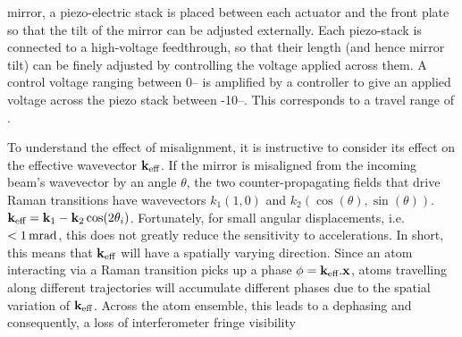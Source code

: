 mirror, a piezo-electric stack is placed between each actuator and the front
plate so that the tilt of the mirror can be adjusted externally. Each
piezo-stack is connected to a high-voltage feedthrough, so that their length
(and hence mirror tilt) can be finely adjusted by controlling the voltage
applied across them. A control voltage ranging between 0-- is
amplified by a controller to give an applied voltage across the piezo stack
between -10--. This corresponds to a travel range of
. \par\noindent To understand the effect of
misalignment, it is instructive to consider its effect on the effective
wavevector \({\textbf k_\textnormal{eff}}\). If the
mirror is misaligned from the incoming beam's wavevector by an angle
\(\theta\),
the two counter-propagating fields that drive Raman transitions have wavevectors
\(k_1 \left(1,0\right)\) and \(k_2 \left(\cos(\theta),\sin(\theta)\right)\).
\({\textbf k_\textnormal{eff}} = {\textbf k_1} - {\textbf k_2} \cos (2\theta_i)\). Fortunately, for
small angular displacements, i.e. \(< \sivalue{1}{\milli\radian}\), this does
not greatly reduce the sensitivity to accelerations. In short, this means that
\({\textbf k_\textnormal{eff}}\) will have a spatially varying direction. Since an atom interacting via
a Raman transition picks up a phase \(\phi = {\textbf k_\textnormal{eff}} . {\textbf x}\), atoms
travelling along different trajectories will accumulate different phases due to
the spatial variation of \({\textbf k_\textnormal{eff}}{}\). Across the atom ensemble, this leads to a
dephasing and consequently, a loss of interferometer fringe
visibility~\cite{Tackmann2012} 
